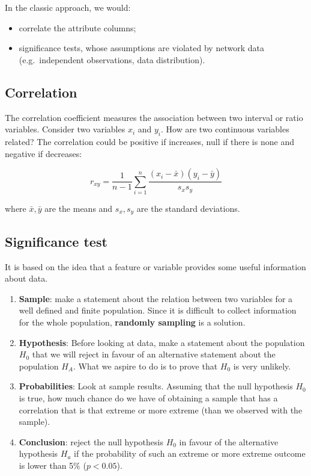 \documentclass[
  notitlepage,
  onecolumn,
  openany]{book}
\providecommand{\tightlist}{%
  \setlength{\itemsep}{0pt}\setlength{\parskip}{0pt}}
\begin{document}
In the classic approach, we would:

\begin{itemize}
\tightlist
\item
  correlate the attribute columns;
\item
  significance tests, whose assumptions are violated by network data (e.g.~independent observations, data distribution).
\end{itemize}

\hypertarget{correlation}{%
\subsection{Correlation}\label{correlation}}

The correlation coefficient measures the association between two interval or ratio variables. Consider two variables \(x_i\) and \(y_i\). How are two continuous variables related? The correlation could be positive if increases, null if there is none and negative if decreases:

\[
r_{xy} = \frac{1}{n-1}\sum^n_{i=1} \frac{(x_i-\bar{x})(y_i-\bar{y})}{s_xs_y}
\]

where \(\bar{x}, \bar{y}\) are the means and \(s_x,s_y\) are the standard deviations.

\hypertarget{significance-test}{%
\subsection{Significance test}\label{significance-test}}

It is based on the idea that a feature or variable provides some useful information about data.

\begin{enumerate}
\def\labelenumi{\arabic{enumi}.}
\tightlist
\item
  \textbf{Sample}: make a statement about the relation between two variables for a well defined and finite population. Since it is difficult to collect information for the whole population, \textbf{randomly sampling} is a solution.
\item
  \textbf{Hypothesis}: Before looking at data, make a statement about the population \(H_0\) that we will reject in favour of an alternative statement about the population \(H_A\). What we aspire to do is to prove that \(H_0\) is very unlikely.
\item
  \textbf{Probabilities}: Look at sample results. Assuming that the null hypothesis \(H_0\) is true, how much chance do we have of obtaining a sample that has a correlation that is that extreme or more extreme (than we observed with the sample).
\item
  \textbf{Conclusion}: reject the null hypothesis \(H_0\) in favour of the alternative hypothesis \(H_a\) if the probability of such an extreme or more extreme outcome is lower than 5\% (\(p<0.05\)).
\end{enumerate}
\end{document}
